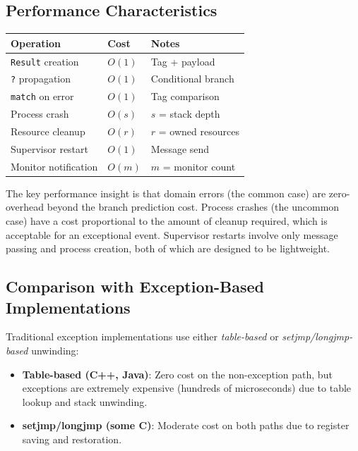 \documentclass[11pt,twocolumn]{article}
\newcommand{\Result}{\texttt{Result}}
\begin{document}
\subsection{Performance Characteristics}

\begin{center}
\begin{tabular}{@{}lll@{}}
\toprule
\textbf{Operation} & \textbf{Cost} & \textbf{Notes} \\
\midrule
\Result{} creation & $O(1)$ & Tag + payload \\
\texttt{?} propagation & $O(1)$ & Conditional branch \\
\texttt{match} on error & $O(1)$ & Tag comparison \\
Process crash & $O(s)$ & $s$ = stack depth \\
Resource cleanup & $O(r)$ & $r$ = owned resources \\
Supervisor restart & $O(1)$ & Message send \\
Monitor notification & $O(m)$ & $m$ = monitor count \\
\bottomrule
\end{tabular}
\end{center}

The key performance insight is that domain errors (the common case) are zero-overhead beyond the branch prediction cost. Process crashes (the uncommon case) have a cost proportional to the amount of cleanup required, which is acceptable for an exceptional event. Supervisor restarts involve only message passing and process creation, both of which are designed to be lightweight.

\subsection{Comparison with Exception-Based Implementations}

Traditional exception implementations use either \emph{table-based} or \emph{setjmp/longjmp-based} unwinding:

\begin{itemize}[leftmargin=*]
  \item \textbf{Table-based (C++, Java)}: Zero cost on the non-exception path, but exceptions are extremely expensive (hundreds of microseconds) due to table lookup and stack unwinding.
  \item \textbf{setjmp/longjmp (some C)}: Moderate cost on both paths due to register saving and restoration.
\end{itemize}
\end{document}
